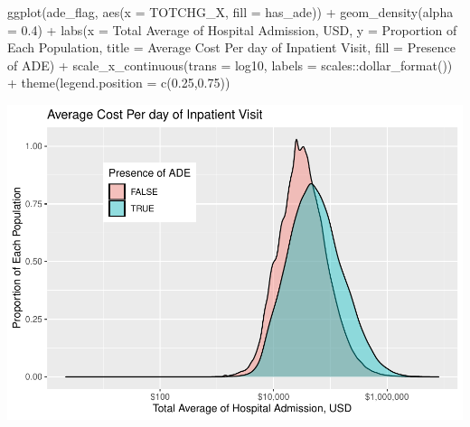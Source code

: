 \documentclass[preprint, 3p,
authoryear]{elsarticle} %
\newenvironment{Shaded}{\begin{snugshade}}{\end{snugshade}}
\newcommand{\AttributeTok}[1]{\textcolor[rgb]{0.77,0.63,0.00}{#1}}
\newcommand{\FloatTok}[1]{\textcolor[rgb]{0.00,0.00,0.81}{#1}}
\newcommand{\FunctionTok}[1]{\textcolor[rgb]{0.00,0.00,0.00}{#1}}
\newcommand{\NormalTok}[1]{#1}
\newcommand{\SpecialCharTok}[1]{\textcolor[rgb]{0.00,0.00,0.00}{#1}}
\newcommand{\StringTok}[1]{\textcolor[rgb]{0.31,0.60,0.02}{#1}}
\begin{document}
\begin{Shaded}
\begin{Highlighting}[]
\FunctionTok{ggplot}\NormalTok{(ade\_flag, }\FunctionTok{aes}\NormalTok{(}\AttributeTok{x =}\NormalTok{ TOTCHG\_X, }\AttributeTok{fill =}\NormalTok{ has\_ade)) }\SpecialCharTok{+}
  \FunctionTok{geom\_density}\NormalTok{(}\AttributeTok{alpha =} \FloatTok{0.4}\NormalTok{) }\SpecialCharTok{+}
  \FunctionTok{labs}\NormalTok{(}\AttributeTok{x =} \StringTok{\textquotesingle{}Total Average of Hospital Admission, USD\textquotesingle{}}\NormalTok{, }\AttributeTok{y =} \StringTok{\textquotesingle{}Proportion of Each Population\textquotesingle{}}\NormalTok{, }\AttributeTok{title =} \StringTok{\textquotesingle{}Average Cost Per day of Inpatient Visit\textquotesingle{}}\NormalTok{, }\AttributeTok{fill =} \StringTok{\textquotesingle{}Presence of ADE\textquotesingle{}}\NormalTok{) }\SpecialCharTok{+}
  \FunctionTok{scale\_x\_continuous}\NormalTok{(}\AttributeTok{trans =} \StringTok{\textquotesingle{}log10\textquotesingle{}}\NormalTok{, }\AttributeTok{labels =}\NormalTok{ scales}\SpecialCharTok{::}\FunctionTok{dollar\_format}\NormalTok{()) }\SpecialCharTok{+}
  \FunctionTok{theme}\NormalTok{(}\AttributeTok{legend.position =} \FunctionTok{c}\NormalTok{(}\FloatTok{0.25}\NormalTok{,}\FloatTok{0.75}\NormalTok{))}
\end{Highlighting}
\end{Shaded}

\includegraphics{final-project-paper_files/figure-latex/charge-plot-1.pdf}
\end{document}
